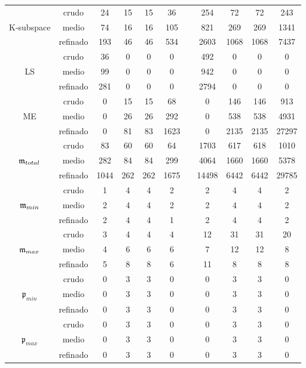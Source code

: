 \begin{table}[htb]
\begin{adjustbox}{width=0.95\columnwidth,center}
\begin{tabular}{ccccccccccc}
			& crudo & 24 & 15 & 15 & 36 &  & 254 & 72 & 72 & 243 \\
			K-subspace & medio & 74 & 16 & 16 & 105 &  & 821 & 269 & 269 & 1341 \\
			& refinado & 193 & 46 & 46 & 534 &  & 2603 & 1068 & 1068 & 7437 \\
			\hline
			& crudo & 36 & 0 & 0 & 0 &  & 492 & 0 & 0 & 0 \\
			LS & medio & 99 & 0 & 0 & 0 &  & 942 & 0 & 0 & 0 \\
			& refinado & 281 & 0 & 0 & 0 &  & 2794 & 0 & 0 & 0 \\
			\hline
			& crudo & 0 & 15 & 15 & 68 &  & 0 & 146 & 146 & 913 \\
			ME & medio & 0 & 26 & 26 & 292 &  & 0 & 538 & 538 & 4931 \\
			& refinado & 0 & 81 & 83 & 1623 &  & 0 & 2135 & 2135 & 27297 \\
			\hline
			& crudo & 83 & 60 & 60 & 64 &  & 1703 & 617 & 618 & 1010 \\
			$\mathfrak{m}_{total}$ & medio & 282 & 84 & 84 & 299 &  & 4064 & 1660 & 1660 & 5378 \\
			& refinado & 1044 & 262 & 262 & 1675 &  & 14498 & 6442 & 6442 & 29785 \\
			\hline
			& crudo & 1 & 4 & 4 & 2 &  & 2 & 4 & 4 & 2 \\
			$\mathfrak{m}_{min}$ & medio & 2 & 4 & 4 & 2 &  & 2 & 4 & 4 & 2 \\
			& refinado & 2 & 4 & 4 & 1 &  & 2 & 4 & 4 & 2 \\
			\hline
			& crudo & 3 & 4 & 4 & 4 &  & 12 & 31 & 31 & 20 \\
			$\mathfrak{m}_{max}$ & medio & 4 & 6 & 6 & 6 &  & 7 & 12 & 12 & 8 \\
			& refinado & 5 & 8 & 8 & 6 &  & 11 & 8 & 8 & 8 \\
			\hline
			& crudo & 0 & 3 & 3 & 0 &  & 0 & 3 & 3 & 0 \\
			$\mathfrak{p}_{min}$ & medio & 0 & 3 & 3 & 0 &  & 0 & 3 & 3 & 0 \\
			& refinado & 0 & 3 & 3 & 0 &  & 0 & 3 & 3 & 0 \\
			\hline
			& crudo & 0 & 3 & 3 & 0 &  & 0 & 3 & 3 & 0 \\
			$\mathfrak{p}_{max}$ & medio & 0 & 3 & 3 & 0 &  & 0 & 3 & 3 & 0 \\
			& refinado & 0 & 3 & 3 & 0 &  & 0 & 3 & 3 & 0 \\
			\hline
		\end{tabular}
	\end{adjustbox}
\end{table}

